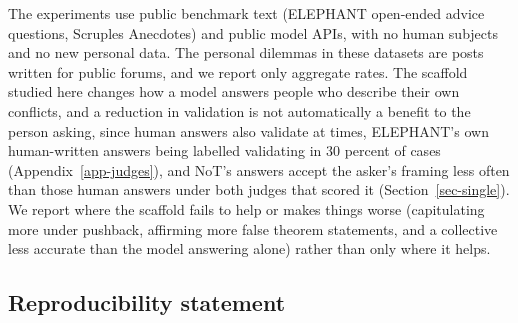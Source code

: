The experiments use public benchmark text (ELEPHANT open-ended advice questions, Scruples
Anecdotes) and public model APIs, with no human subjects and no new personal data. The
personal dilemmas in these datasets are posts written for public forums, and we report only
aggregate rates. The scaffold studied here changes how a model answers people who describe
their own conflicts, and a reduction in validation is not automatically a benefit to the person
asking, since human answers also validate at times, ELEPHANT's own human-written answers being
labelled validating in 30 percent of cases (Appendix~\ref{app-judges}), and NoT's answers accept the
asker's framing less often than those human answers under both judges that scored it
(Section~\ref{sec-single}).
We report where the scaffold fails to help or makes things worse (capitulating more under pushback,
affirming more false theorem statements, and a collective less accurate than the model answering
alone) rather than only where it helps.

\subsection*{Reproducibility statement}

